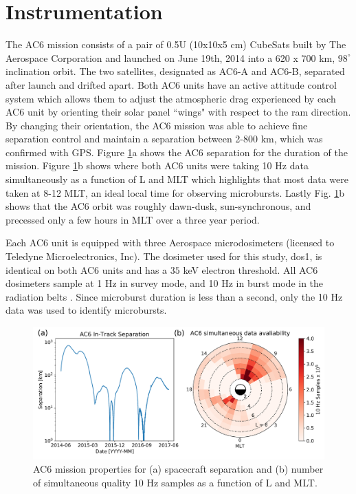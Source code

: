 \documentclass[draft]{agujournal2019}
\begin{document}
\section{Instrumentation} \label{instrumentation}
The AC6 mission consists of a pair of 0.5U (10x10x5 cm) CubeSats built by The Aerospace Corporation and launched on June 19th, 2014 into a 620 x 700 km, $98^\circ$ inclination orbit. The two satellites, designated as AC6-A and AC6-B, separated after launch and drifted apart. Both AC6 units have an active attitude control system which allows them to adjust the atmospheric drag experienced by each AC6 unit by orienting their solar panel ``wings" with respect to the ram direction. By changing their orientation, the AC6 mission was able to achieve fine separation control and maintain a separation between 2-800 km, which was confirmed with GPS. Figure \ref{fig1}a shows the AC6 separation for the duration of the mission. Figure \ref{fig1}b shows where both AC6 units were taking 10 Hz data simultaneously as a function of L and MLT which highlights that most data were taken at 8-12 MLT, an ideal local time for observing microbursts. Lastly Fig. \ref{fig1}b shows that the AC6 orbit was roughly dawn-dusk, sun-synchronous, and precessed only a few hours in MLT over a three year period.

Each AC6 unit is equipped with three Aerospace microdosimeters (licensed to Teledyne Microelectronics, Inc). The dosimeter used for this study, dos1, is identical on both AC6 units and has a $35$ keV electron threshold. All AC6 dosimeters sample at 1 Hz in survey mode, and 10 Hz in burst mode in the radiation belts  \cite{O'brien2016}. Since microburst duration is less than a second, only the 10 Hz data was used to identify microbursts. 

\begin{figure}
\includegraphics[width=\textwidth]{fig1.pdf}
\caption{AC6 mission properties for (a) spacecraft separation and (b) number of simultaneous quality 10 Hz samples as a function of L and MLT.} \label{fig1}
\end{figure}
\end{document}
